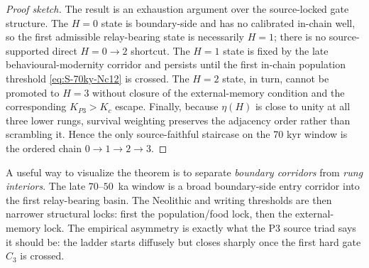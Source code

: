 \documentclass[11pt]{article}
\begin{document}
\begin{proof}[Proof sketch]The result is an exhaustion argument over the source-locked gate structure. The $H{=}0$ state is boundary-side and has no calibrated in-chain well, so the first admissible relay-bearing state is necessarily $H{=}1$; there is no source-supported direct $H{=}0\to 2$ shortcut. The $H{=}1$ state is fixed by the late behavioural-modernity corridor and persists until the first in-chain population threshold \eqref{eq:S-70ky-Nc12} is crossed. The $H{=}2$ state, in turn, cannot be promoted to $H{=}3$ without closure of the external-memory condition and the corresponding $K_{P3}>K_c$ escape. Finally, because $\eta(H)$ is close to unity at all three lower rungs, survival weighting preserves the adjacency order rather than scrambling it. Hence the only source-faithful staircase on the 70 kyr window is the ordered chain $0\to1\to2\to3$.
\end{proof}A useful way to visualize the theorem is to separate \emph{boundary corridors} from \emph{rung interiors}. The late $70$--$50$~ka window is a broad boundary-side entry corridor into the first relay-bearing basin. The Neolithic and writing thresholds are then narrower structural locks: first the population/food lock, then the external-memory lock. The empirical asymmetry is exactly what the P3 source triad says it should be: the ladder starts diffusely but closes sharply once the first hard gate $C_3$ is crossed.
\end{document}
